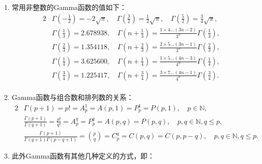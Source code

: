 \begin{property}
\begin{enumerate}[noitemsep]
		\item 常用非整数的Gamma函数的值如下：
		\begin{alignat*}{2}
		&\Gamma\left(-\frac{1}{2}\right) = -2\sqrt{\pi},\quad  \Gamma\left(\frac{3}{2}\right) = \frac{1}{2}\sqrt{\pi},\quad  \Gamma\left(\frac{5}{2}\right) = \frac{3}{4}\sqrt{\pi},\\
		& \Gamma\left(\frac{1}{3}\right) = 2.678938,\quad \Gamma\left(n+\frac{1}{3}\right) = \frac{1\times 4 \dots \left(3n-2\right)}{3^n}\Gamma\left(\frac{1}{3}\right),\\
		&\Gamma\left(\frac{2}{3}\right) = 1.354118,\quad \Gamma\left(n+\frac{2}{3}\right) = \frac{2\times 5 \dots \left(3n-1\right)}{3^n}\Gamma\left(\frac{2}{3}\right),\\
		&\Gamma\left(\frac{1}{4}\right) = 3.625600,\quad \Gamma\left(n+\frac{1}{4}\right) = \frac{1\times 5 \dots \left(4n-3\right)}{4^n}\Gamma\left(\frac{1}{4}\right),\\
		&\Gamma\left(\frac{3}{4}\right) = 1.225417,\quad \Gamma\left(n+\frac{3}{4}\right) = \frac{3\times 7 \dots \left(4n-1\right)}{4^n}\Gamma\left(\frac{3}{4}\right).\\
		\end{alignat*}
		
		\item Gamma函数与组合数和排列数的关系：
		\begin{alignat*}{2}
		&\Gamma\left(p+1\right) = p! = A^1_p = A\left(p,1\right) = P^1_p = P\left(p,1\right), \quad p \in \mathbb{N},\\
		&\frac{\Gamma\left(p+1\right)}{\Gamma\left(q+1\right)}  = \frac{p!}{q!}= A^q_p = P^q_p = A\left(p,q\right) = P\left(p,q\right), \quad p,q \in \mathbb{N},q \le p,\\
		& \frac{\Gamma\left(p+1\right)}{\Gamma\left(q+1\right)\Gamma\left(p-q+1\right)} = \binom{p}{q} = C_p^q = C(p,q)=C(p,{p-q}) , \quad p,q \in \mathbb{N},q \le p.
		\end{alignat*}
		
		
		
		\item 此外Gamma函数有其他几种定义的方式，即：
		\begin{enumerate}[noitemsep]
			

\end{enumerate}
\end{enumerate}
\end{property}
